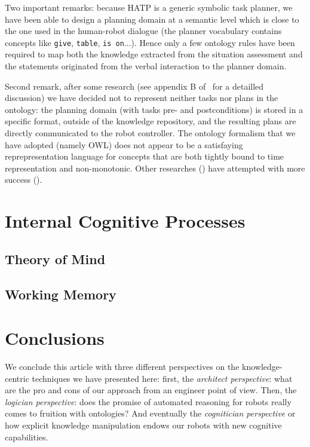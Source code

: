 \documentclass[letterpaper, 10 pt, conference]{ieeeconf}  %
\begin{document}
Two important remarks: because HATP is a generic symbolic task planner, we have
been able to design a planning domain at a semantic level which is close to the
one used in the human-robot dialogue (the planner vocabulary contains concepts
like \texttt{give}, \texttt{table}, \texttt{is on}...). Hence only a few
ontology rules have been required to map both the knowledge extracted from the
situation assessment and the statements originated from the verbal interaction
to the planner domain.

Second remark, after some research (see appendix B of~\cite{ma these} for a
detailled discussion)  we have decided not to represent neither tasks nor plans
in the ontology: the planning domain (with tasks pre- and postconditions) is
stored in a specific format, outside of the knowledge repository, and the
resulting plans are directly communicated to the robot controller. The ontology
formalism that we have adopted (namely OWL) does not appear to be a satisfaying
reprepresentation language for concepts that are both tightly bound to time
representation and non-monotonic. Other researches (\cite{tenorth...}) have attempted with more success ().

\section{Internal Cognitive Processes}
\label{sect|intern}

\subsection{Theory of Mind}

\cite{Warnier2012a}

\subsection{Working Memory}

\section{Conclusions}
\label{sect|conclusion}

We conclude this article with three different perspectives on the knowledge-centric
techniques we have presented here: first, the \emph{architect perspective}:
what are the pro and cons of our approach from an engineer point of view. Then,
the \emph{logician perspective}: does the promise of automated reasoning for
robots really comes to fruition with ontologies? And eventually the
\emph{cognitician perspective} or how explicit knowledge manipulation endows
our robots with new cognitive capabilities.
\end{document}
